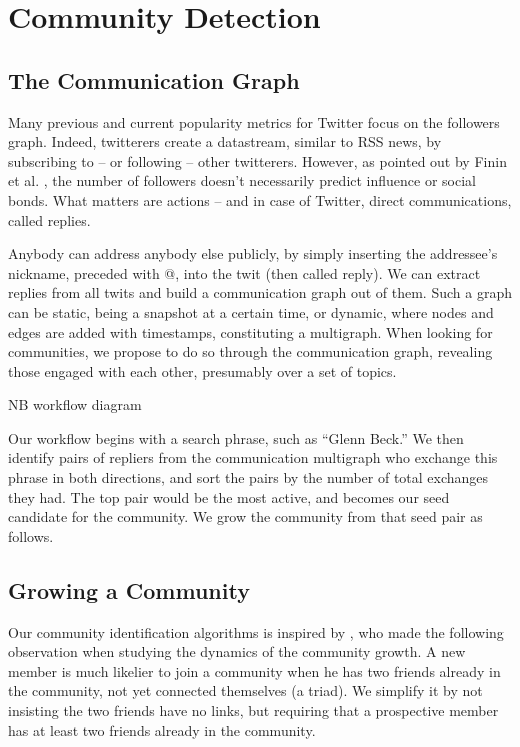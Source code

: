 \section{Community Detection}

\subsection{The Communication Graph}

Many previous and current popularity metrics for Twitter focus on the followers graph.  Indeed, twitterers create a datastream, similar to RSS news, by subscribing to -- or following -- other twitterers.  However, as pointed out by Finin et al. \cite{Finin2007}, the number of followers doesn’t necessarily predict influence or social bonds.  What matters are actions -- and in case of Twitter, direct communications, called replies.

Anybody can address anybody else publicly, by simply inserting the addressee’s nickname, preceded with @, into the twit (then called reply).  We can extract replies from all twits and build a communication graph out of them.  Such a graph can be static, being a snapshot at a certain time, or dynamic, where nodes and edges are added with timestamps, constituting a multigraph.  When looking for communities, we propose to do so through the communication graph, revealing those engaged with each other, presumably over a set of topics.

NB workflow diagram

Our workflow begins with a search phrase, such as “Glenn Beck.”  We then identify pairs of repliers from the communication multigraph who exchange this phrase in both directions, and sort the pairs by the number of total exchanges they had.  The top pair would be the most active, and becomes our seed candidate for the community.  We grow the community from that seed pair as follows.

\subsection{Growing a Community}

Our community identification algorithms is inspired by \cite{Backstrom06}, who made the following observation when studying the dynamics of the community growth.  A new member is much likelier to join a community when he has two friends already in the community, not yet connected themselves (a triad).  We simplify it by not insisting the two friends have no links, but requiring that a prospective member has at least two friends already in the community.

